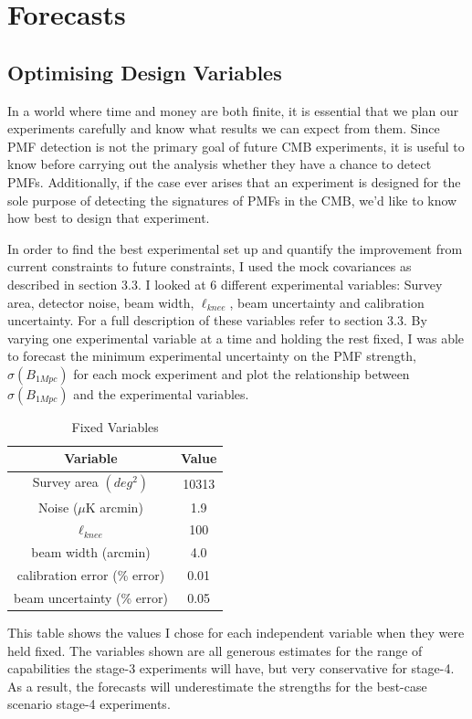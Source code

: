 \section{Forecasts}

\subsection{Optimising Design Variables}

In a world where time and money are both finite, it is essential that we plan our experiments carefully and know what results we can expect from them. Since PMF detection is not the primary goal of future CMB experiments, it is useful to know before carrying out the analysis whether they have a chance to detect PMFs. Additionally, if the case ever arises that an experiment is designed for the sole purpose of detecting the signatures of PMFs in the CMB, we'd like to know how best to design that experiment. 

In order to find the best experimental set up and quantify the improvement from current constraints to future constraints, I used the mock covariances as described in section 3.3. I looked at 6 different experimental variables: Survey area, detector noise, beam width, $\ell_{knee}$, beam uncertainty and calibration uncertainty. For a full description of these variables refer to section 3.3. By varying one experimental variable at a time and holding the rest fixed, I was able to forecast the minimum experimental uncertainty on the PMF strength, $\sigma(B_{1Mpc})$ for each mock experiment and plot the relationship between $\sigma(B_{1Mpc})$ and the experimental variables.

\begin{table}[h]
\centering
\caption{Fixed Variables}
\label{table: fixed-stats}
\begin{tabular}{l|l}
\multicolumn{1}{c}{Variable} & \multicolumn{1}{|c}{Value} \\ \hline
\multicolumn{1}{c}{Survey area $(deg^2)$} & \multicolumn{1}{|c}{10313}  \\
\multicolumn{1}{c}{Noise ($\mu$K arcmin)} & \multicolumn{1}{|c}{1.9}   \\
\multicolumn{1}{c}{$\ell_{knee}$} & \multicolumn{1}{|c}{100} \\
\multicolumn{1}{c}{beam width (arcmin)} & \multicolumn{1}{|c}{4.0}   \\
\multicolumn{1}{c}{calibration error (\% error)} & \multicolumn{1}{|c}{0.01} \\
\multicolumn{1}{c}{beam uncertainty (\% error)} & \multicolumn{1}{|c}{0.05}
\end{tabular}
\begin{flushleft}
This table shows the values I chose for each independent variable when they were held fixed. The variables shown are all generous estimates for the range of capabilities the stage-3 experiments will have, but very conservative for stage-4. As a result, the forecasts will underestimate the strengths for the best-case scenario stage-4 experiments.
\end{flushleft}
\end{table}

